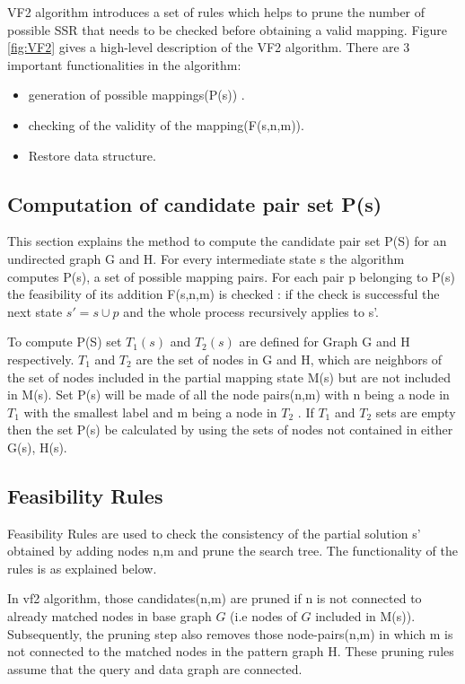 VF2 algorithm introduces a set of rules which helps to prune the number of possible SSR that needs to be checked before obtaining a valid mapping. Figure \ref{fig:VF2} gives a high-level description of the VF2 algorithm.
There are 3 important functionalities in the algorithm: 
\begin{itemize}
\item generation of possible mappings(P(s)) .
\item checking of the validity of the mapping(F(s,n,m)).
\item Restore data structure.
\end{itemize}



\subsection{Computation of candidate pair set P(s)}
This section explains the method to compute the candidate pair set P(S) for an undirected graph G and H. 
For every intermediate state s the algorithm computes P(s), a set of possible mapping pairs. For each pair p belonging to P(s) the feasibility of its addition F(s,n,m) is checked : if the check is successful the next state $s' = s \cup p$ and the whole process recursively applies to s'.

To compute P(S) set $T_1(s)$ and $T_2(s)$ are defined for Graph G and H respectively. $T_1$ and $T_2$ are the set of  nodes in G and H, which are neighbors of the set of nodes included in the partial mapping state M(s) but are not included in M(s).
Set P(s) will be made of all the node pairs(n,m) with n being a node in $T_1$ with the smallest label  and m being a node in $T_2$ . If  $T_1$ and $T_2$ sets are empty then the set P(s) be calculated by using the sets of nodes not contained in either G(s), H(s).

\subsection{Feasibility Rules}
Feasibility Rules are used to check the consistency of the partial solution s' obtained by adding nodes n,m and prune the search tree. The functionality of the rules is as explained below.

In vf2 algorithm, those candidates(n,m) are pruned if n is not connected to already matched nodes in base graph $G$
(i.e nodes of $G$ included in M(s)).
Subsequently, the pruning step also removes those node-pairs(n,m) in which m is not connected to the matched 
nodes in the pattern graph H. These pruning rules assume that the query and data graph are connected.\\

